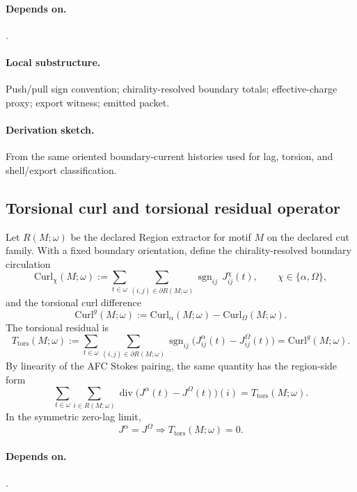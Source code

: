 \paragraph{Depends on.} .
\paragraph{Local substructure.} Push/pull sign convention; chirality-resolved boundary totals; effective-charge proxy; export witness; emitted packet.
\paragraph{Derivation sketch.} From the same oriented boundary-current histories used for lag, torsion, and shell/export classification.

\subsection{Torsional curl and torsional residual operator}\label{subsec:torsional-operators}
\begin{definition}
\label{def:torsional-operator}
Let $R(M;\omega)$ be the declared Region extractor for motif $M$ on the declared cut family. With a fixed boundary orientation, define the chirality-resolved boundary circulation
\[
\mathrm{Curl}_{\chi}(M;\omega):=
\sum_{t\in\omega}\sum_{(i,j)\in\partial R(M;\omega)}
\operatorname{sgn}_{ij}\,J^{\chi}_{ij}(t),
\qquad \chi\in\{\alpha,\Omega\},
\]
and the torsional curl difference
\[
\mathrm{Curl}^{g}(M;\omega):=\mathrm{Curl}_{\alpha}(M;\omega)-\mathrm{Curl}_{\Omega}(M;\omega).
\]
The torsional residual is
\[
T_{\mathrm{tors}}(M;\omega):=
\sum_{t\in\omega}\sum_{(i,j)\in\partial R(M;\omega)}
\operatorname{sgn}_{ij}\bigl(J^{\alpha}_{ij}(t)-J^{\Omega}_{ij}(t)\bigr)
= \mathrm{Curl}^{g}(M;\omega).
\]
By linearity of the AFC Stokes pairing, the same quantity has the region-side form
\[
\sum_{t\in\omega}\sum_{i\in R(M;\omega)}
\operatorname{div}\!\bigl(J^{\alpha}(t)-J^{\Omega}(t)\bigr)(i)
= T_{\mathrm{tors}}(M;\omega).
\]
In the symmetric zero-lag limit,
\[
J^{\alpha}=J^{\Omega}\Longrightarrow T_{\mathrm{tors}}(M;\omega)=0.
\]
\end{definition}

\paragraph{Depends on.} .

